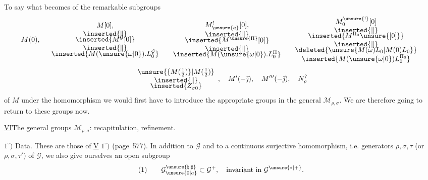 To say what becomes of the remarkable subgroups
\[
M(0),\quad
\begin{array}{c}
M[0],\\
\inserted{\Vert}\\[-4pt]
\inserted{M^{\mathcal{G}}[0]}\\
\inserted{\Vert}\\[-4pt]
\inserted{M(\unsure{\omega|0}).L_{0}^{\mathcal{G}}}
\end{array}
\quad
\begin{array}{c}
M_{\unsure{a}}^{!}[0],\\
\inserted{\Vert}\\[-4pt]
\inserted{M^{\unsure{\Pi}}[0]}\\
\inserted{\Vert}\\[-4pt]
\inserted{M(\unsure{\omega|0}).L_{0}^{\Pi}}
\end{array}
\quad
\begin{array}{c}
M_{0}^{\unsure{!}}[0]\\
\inserted{\Vert}\\[-4pt]
\inserted{M^{\Pi_{0}}\unsure{[0]}}\\
\inserted{\Vert}\\[-4pt]
\deleted{\unsure{M(\omega)L_{0}|M(0)L_{0}}}\\
\inserted{M(\unsure{\omega|0})L_{0}^{\Pi_{0}}}
\end{array}
\]
\[
\begin{array}{c}
\unsure{\{M(\tfrac12)\}|M(\tfrac12)}\\
\inserted{\Vert}\\[-4pt]
\inserted{Z_{\sigma0}^{!}}
\end{array},\quad
M'(-\bar{\jmath}),\quad M'''(-\bar{\jmath}),\quad N_{\rho}^{?}
\]
of $M$ under the homomorphism
we would first have to introduce the appropriate groups in the general $\mathcal{M}_{\rho,\sigma}$.
We are therefore going to return to these groups now.



\uline{VI}\quad The general groups $\mathcal{M}_{\rho,\sigma}$:
recapitulation, refinement.

$1^\circ)$ Data. These are those of \uline{V} $1^\circ)$ (page~577).
In addition to $\mathcal{G}$  and to
a continuous surjective homomorphism, i.e. generators $\rho,\sigma,\tau$
(or $\rho,\sigma,\tau'$) of $\mathcal{G}$, we also give ourselves an open subgroup
\[
(1)\qquad \mathcal{G}_{\unsure{0|a}}^{\unsure{\natural|\sharp}}
\subset\mathcal{G}^{+},\quad
\text{invariant in }\mathcal{G}^{\unsure{*|+}}.
\]

